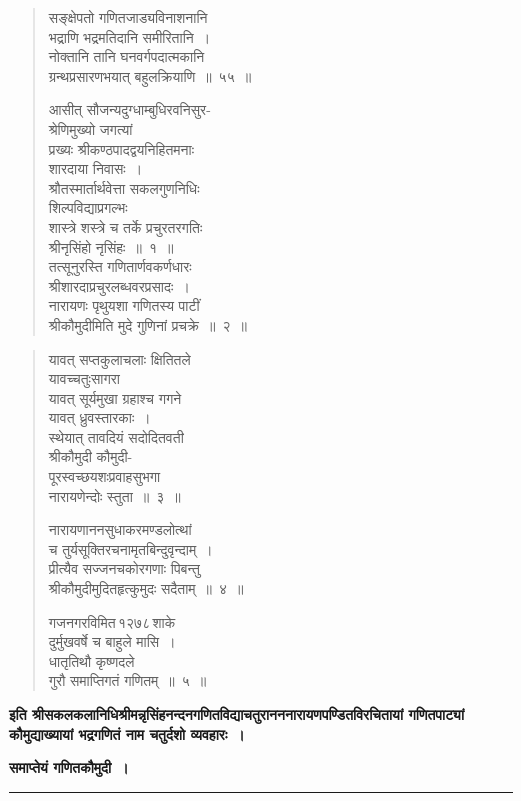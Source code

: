 \documentclass[11pt, openany]{book}
\begin{document}
\newpage

\begin{quote}
	
{\gk सङ्क्षेपतो गणितजाड्यविनाशनानि\\
भद्राणि भद्रमतिदानि समीरितानि~।\\
नोक्तानि तानि घनवर्गपदात्मकानि\\
ग्रन्थप्रसारणभयात् बहुलक्रियाणि~॥~५५~॥\\}

 \label{ch15}
{\gk आसीत् सौजन्यदुग्धाम्बुधिरवनिसुर-\\
श्रेणिमुख्यो जगत्यां\\
प्रख्यः श्रीकण्ठपादद्वयनिहितमनाः\\
शारदाया निवासः~।\\
श्रौतस्मार्तार्थवेत्ता सकलगुणनिधिः\\
शिल्पविद्याप्रगल्भः\\
शास्त्रे शस्त्रे च तर्के प्रचुरतरगतिः\\
श्रीनृसिंहो नृसिंहः~॥~१~॥}\\

{\gk तत्सूनुरस्ति गणितार्णवकर्णधारः\\
श्रीशारदाप्रचुरलब्धवरप्रसादः~।\\
नारायणः पृथुयशा गणितस्य पाटीं\\
श्रीकौमुदीमिति मुदे गुणिनां प्रचक्रे~॥~२~॥}
\end{quote}

\newpage

\begin{quote}
{\gk यावत् सप्तकुलाचलाः क्षितितले\\
यावच्चतुःसागरा\\
यावत् सूर्यमुखा ग्रहाश्च गगने\\
यावत् ध्रुवस्तारकाः~।\\
स्थेयात् तावदियं सदोदितवती\\
श्रीकौमुदी कौमुदी-\\
पूरस्वच्छयशःप्रवाहसुभगा\\
नारायणेन्दोः स्तुता~॥~३~॥\\}

{\gk नारायणाननसुधाकरमण्डलोत्थां\\
च तुर्यसूक्तिरचनामृतबिन्दुवृन्दाम्~।\\
प्रीत्यैव सज्जनचकोरगणाः पिबन्तु\\
श्रीकौमुदीमुदितहृत्कुमुदः सदैताम्~॥~४~॥\\}

{\gk गजनगरविमित\textendash \,१२७८\textendash \,शाके \\
दुर्मुखवर्षे च बाहुले मासि~।\\
धातृतिथौ कृष्णदले\\
गुरौ समाप्तिगतं गणितम्~॥~५~॥}
\end{quote}

\newpage

\begin{center}
\textbf{इति श्रीसकलकलानिधिश्रीमन्नृसिंहनन्दनगणितविद्याचतुरानननारायणपण्डितविरचितायां गणितपाट्यां कौमुद्याख्यायां भद्रगणितं नाम चतुर्दशो व्यवहारः~।}\\
\vspace{10mm}

\textbf{समाप्तेयं गणितकौमुदी~।}\\
\vspace{4mm}

\rule{2cm}{0.4mm}
\end{center}
\end{document}
